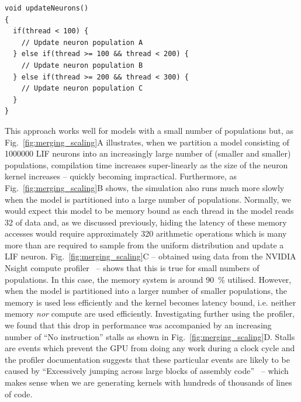 \documentclass[9pt,twocolumn,twoside,lineno]{pnas-new}
\newcommand{\todo}[1]{\textbf{\textsc{\textcolor{red}{(TODO: #1)}}}}
\begin{document}
\begin{lstlisting}
void updateNeurons()
{
  if(thread < 100) {
    // Update neuron population A
  } else if(thread >= 100 && thread < 200) {
    // Update neuron population B
  } else if(thread >= 200 && thread < 300) {
    // Update neuron population C
  }
}

\end{lstlisting}
%
This approach works well for models with a small number of populations but, as Fig.~\ref{fig:merging_scaling}A illustrates, when we partition a model consisting of \num{1000000} LIF neurons into an increasingly large number of (smaller and smaller) populations, compilation time increases super-linearly as the size of the neuron kernel increases -- quickly becoming impractical.
Furthermore, as Fig.~\ref{fig:merging_scaling}B shows, the simulation also runs much more slowly when the model is partitioned into a large number of populations.
Normally, we would expect this model to be memory bound as each thread in the model reads \SI{32}{\byte} of data and, as we discussed previously, hiding the latency of these memory accesses would require approximately 320 arithmetic operations which is many more than are required to sample from the uniform distribution and update a LIF neuron.
Fig.~\ref{fig:merging_scaling}C -- obtained using data from the NVIDIA Nsight compute profiler~\citep{NVIDIACorporation2020} -- shows that this is true for small numbers of populations.
In this case, the memory system is around \SI{90}{\percent} utilised.
However, when the model is partitioned into a larger number of smaller populations, the memory is used less efficiently and the kernel becomes latency bound, i.e. neither memory \emph{nor} compute are used efficiently.
Investigating further using the profiler, we found that this drop in performance was accompanied by an increasing number of ``No instruction'' stalls as shown in Fig.~\ref{fig:merging_scaling}D.
Stalls are events which prevent the GPU from doing any work during a clock cycle and the profiler documentation suggests that these particular events are likely to be caused by ``Excessively jumping across large blocks of assembly code''~\citep[p47]{NVIDIACorporation2020} -- which makes sense when we are generating kernels with hundreds of thousands of lines of code.
\end{document}
